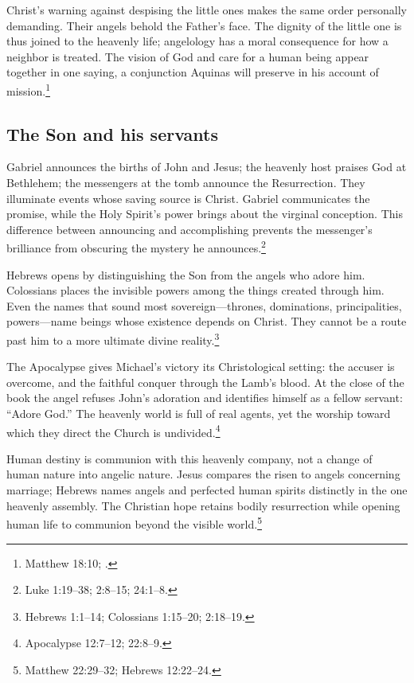 Christ's warning against despising the little ones makes the same order
personally demanding. Their angels behold the Father's face. The dignity
of the little one is thus joined to the heavenly life; angelology has a
moral consequence for how a neighbor is treated. The vision of God and
care for a human being appear together in one saying, a conjunction Aquinas
will preserve in his account of mission.\footnote{Matthew 18:10;
.}

\subsection{The Son and his servants}

Gabriel announces the births of John and Jesus; the heavenly host praises
God at Bethlehem; the messengers at the tomb announce the Resurrection.
They illuminate events whose saving source is Christ. Gabriel communicates
the promise, while the Holy Spirit's power brings about the virginal
conception. This difference between announcing and accomplishing prevents
the messenger's brilliance from obscuring the mystery he announces.\footnote{Luke
1:19--38; 2:8--15; 24:1--8.}

Hebrews opens by distinguishing the Son from the angels who adore him.
Colossians places the invisible powers among the things created through
him. Even the names that sound most sovereign---thrones, dominations,
principalities, powers---name beings whose existence depends on Christ.
They cannot be a route past him to a more ultimate divine reality.\footnote{Hebrews
1:1--14; Colossians 1:15--20; 2:18--19.}

The Apocalypse gives Michael's victory its Christological setting: the
accuser is overcome, and the faithful conquer through the Lamb's blood.
At the close of the book the angel refuses John's adoration and identifies
himself as a fellow servant: ``Adore God.'' The heavenly world is full of
real agents, yet the worship toward which they direct the Church is
undivided.\footnote{Apocalypse 12:7--12; 22:8--9.}

Human destiny is communion with this heavenly company, not a change of human
nature into angelic nature. Jesus compares the risen to angels concerning
marriage; Hebrews names angels and perfected human spirits distinctly in
the one heavenly assembly. The Christian hope retains bodily resurrection
while opening human life to communion beyond the visible world.\footnote{Matthew
22:29--32; Hebrews 12:22--24.}
